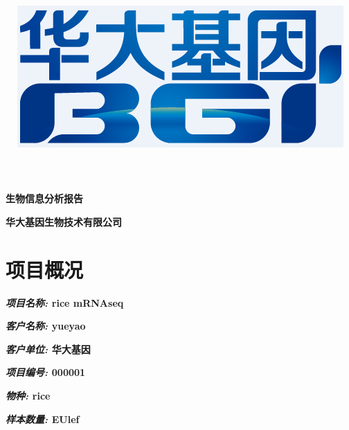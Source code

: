 \documentclass[10pt, oneside,a4paper]{article}
\begin{document}
\vspace{50 mm}
\title{\includegraphics[width=80 mm, keepaspectratio]{./source/BGI-LOGO2.png}}
\maketitle
\vspace{30 mm}
\begin{center}
\huge{\textbf {生物信息分析报告}}\par
\vspace{50 mm}
\textbf{\large{华大基因生物技术有限公司}}\par
\end{center}
\newpage
\renewcommand{\contentsname}{目录}
\tableofcontents
\newpage
\section{项目概况}
\vspace{25 mm}
\textbf{\textit{\large{项目名称: }}\large{rice mRNAseq}}\par
\vspace{5 mm}
\textbf{\textit{\large{客户名称: }}\large{yueyao}}\par
\vspace{5 mm}
\textbf{\textit{\large{客户单位: }}\large{华大基因}}\par
\vspace{5 mm}
\textbf{\textit{\large{项目编号: }}\large{000001}}\par
\vspace{5 mm}
\textbf{\textit{\large{物\hspace{2 em}种: }}\large{rice}}\par
\vspace{5 mm}
\textbf{\textit{\large{样本数量: }}\large{EUlef}}\par
\newpage
\end{document}
